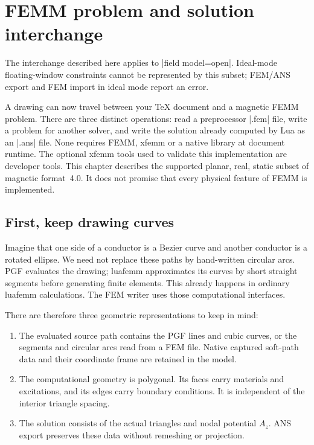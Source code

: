 \section{FEMM problem and solution interchange}
\label{sec:interchange}
The interchange described here applies to |field model=open|. Ideal-mode
floating-window constraints cannot be represented by this subset; FEM/ANS
export and FEM import in ideal mode report an error.

A drawing can now travel between your TeX document and a magnetic FEMM problem.
There are three distinct operations: read a preprocessor |.fem| file, write a
problem for another solver, and write the solution already computed by Lua as
an |.ans| file. None requires FEMM, xfemm or a native library at document runtime.
The optional xfemm tools used to validate this implementation are developer tools.
This chapter describes the supported planar, real, static subset of magnetic
format~4.0. It does not promise that every physical feature of FEMM is implemented.

\subsection{First, keep drawing curves}

Imagine that one side of a conductor is a Bezier curve and another conductor
is a rotated ellipse. We need not replace these paths by hand-written circular
arcs. PGF evaluates the drawing; luafemm approximates its curves by short straight
segments before generating finite elements. This already happens in ordinary
luafemm calculations. The FEM writer uses those computational interfaces.

There are therefore three geometric representations to keep in mind:
\begin{enumerate}
\item The evaluated source path contains the PGF lines and cubic curves, or
      the segments and circular arcs read from a FEM file. Native captured
      soft-path data and their coordinate frame are retained in the model.
\item The computational geometry is polygonal. Its faces carry materials and
      excitations, and its edges carry boundary conditions. It is independent
      of the interior triangle spacing.
\item The solution consists of the actual triangles and nodal potential $A_z$.
      ANS export preserves these data without remeshing or projection.
\end{enumerate}

